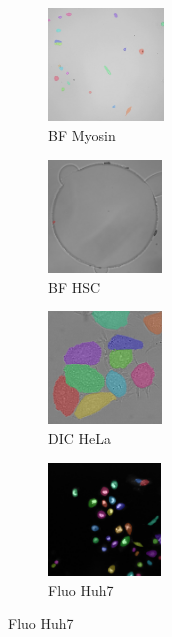 \documentclass[../cellseek_paper.tex]{subfiles}
\begin{document}
\begin{figure}[H]
  \vspace{0.8em}

  \begin{subfigure}{0.23\textwidth}
    \centering
    \includegraphics[width=\textwidth,height=3cm]{images/examples/myosin_segmented.jpg}
    \caption{\footnotesize BF Myosin}
    \label{fig:myosin}
  \end{subfigure}
  \hfill
  \begin{subfigure}{0.23\textwidth}
    \centering
    \includegraphics[width=\textwidth,height=3cm]{images/examples/hsc_segmented.jpg}
    \caption{\footnotesize BF HSC}
    \label{fig:hsc}
  \end{subfigure}
  \hfill
  \begin{subfigure}{0.23\textwidth}
    \centering
    \includegraphics[width=\textwidth,height=3cm]{images/examples/hela_segmented.jpg}
    \caption{\footnotesize DIC HeLa}
    \label{fig:hela}
  \end{subfigure}
  \hfill
  \begin{subfigure}{0.23\textwidth}
    \centering
    \includegraphics[width=\textwidth,height=3cm]{images/examples/huh7_segmented.jpg}
    \caption{\footnotesize Fluo Huh7}
    \label{fig:huh7}
  \end{subfigure}


\end{figure}
\end{document}
